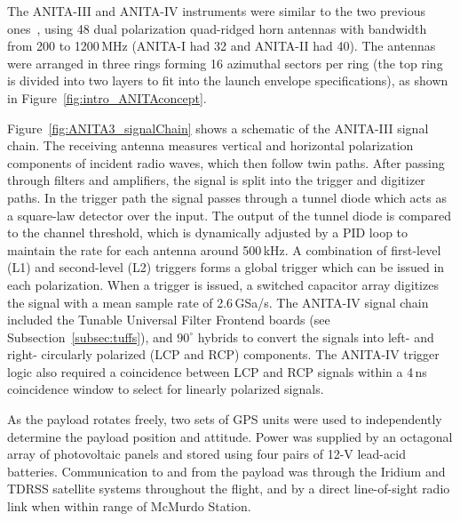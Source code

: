 The ANITA-III and ANITA-IV instruments were similar to the two previous
ones~\cite{ANITA1paper,ANITA2paper}, using 48 dual polarization quad-ridged horn antennas with bandwidth from 200 to 1200\,MHz (ANITA-I had 32 and ANITA-II had 40). 
The antennas were arranged in three rings forming 16 azimuthal sectors per ring (the top ring is divided into two layers to fit into the launch envelope specifications), as shown in Figure~\ref{fig:intro_ANITAconcept}.

Figure~\ref{fig:ANITA3_signalChain} shows a schematic of the ANITA-III signal chain. 
The receiving antenna measures vertical and horizontal polarization components of incident radio waves, which then follow twin paths. 
After passing through filters and amplifiers, the signal is split into
the trigger and digitizer paths.
In the trigger path the signal passes
through a tunnel diode which acts as a square-law detector over the
input. The output of the tunnel diode is compared to the channel
threshold, which is dynamically adjusted by a PID loop to maintain the
rate for each antenna around 500\,kHz. A combination of first-level (L1) and second-level (L2) triggers forms a
global trigger which can be issued in each polarization.
When a trigger is issued, a switched capacitor array digitizes the signal with a mean sample rate of 2.6\,GSa/s. 
The ANITA-IV signal chain included the Tunable Universal Filter Frontend boards (see Subsection~\ref{subsec:tuffs}), and $90^{\circ}$ hybrids to convert the signals into left- and right- circularly polarized (LCP and RCP) components. 
The ANITA-IV trigger logic also required a coincidence between LCP and RCP signals within a 4\,ns coincidence window to select for linearly polarized signals. 

As the payload rotates freely, two sets of GPS units were used to independently determine the
payload position and attitude.
Power was supplied by an octagonal array of photovoltaic panels and stored using four pairs of 12-V lead-acid batteries.
Communication to and from the payload was through the Iridium and TDRSS satellite systems throughout the flight, and by a direct line-of-sight radio link when within range of McMurdo Station.


